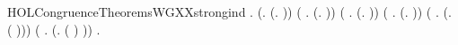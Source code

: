 \begin{SaveVerbatim}{HOLCongruenceTheoremsWGXXstrongind}
\HOLTokenTurnstile{} \HOLSymConst{\HOLTokenForall{}}.
       (\HOLSymConst{\HOLTokenForall{}}.  (\HOLTokenLambda{}. )) \HOLSymConst{\HOLTokenConj{}}
       (\HOLSymConst{\HOLTokenForall{}} .   \HOLSymConst{\HOLTokenImp{}}  (\HOLTokenLambda{}.  )) \HOLSymConst{\HOLTokenConj{}}
       (\HOLSymConst{\HOLTokenForall{}} .
              \HOLSymConst{\HOLTokenConj{}}   \HOLSymConst{\HOLTokenConj{}}   \HOLSymConst{\HOLTokenConj{}}   \HOLSymConst{\HOLTokenImp{}}
             (\HOLTokenLambda{}.   \HOLSymConst{\ensuremath{+}}  )) \HOLSymConst{\HOLTokenConj{}}
       (\HOLSymConst{\HOLTokenForall{}} .
              \HOLSymConst{\HOLTokenConj{}}   \HOLSymConst{\HOLTokenConj{}}   \HOLSymConst{\HOLTokenConj{}}   \HOLSymConst{\HOLTokenImp{}}
             (\HOLTokenLambda{}.   \HOLSymConst{\ensuremath{\parallel}}  )) \HOLSymConst{\HOLTokenConj{}}
       (\HOLSymConst{\HOLTokenForall{}} .   \HOLSymConst{\HOLTokenConj{}}   \HOLSymConst{\HOLTokenImp{}}  (\HOLTokenLambda{}. \HOLConst{\ensuremath{\nu}}  ( ))) \HOLSymConst{\HOLTokenConj{}}
       (\HOLSymConst{\HOLTokenForall{}} .   \HOLSymConst{\HOLTokenConj{}}   \HOLSymConst{\HOLTokenImp{}}  (\HOLTokenLambda{}.  ( ) )) \HOLSymConst{\HOLTokenImp{}}
       \HOLSymConst{\HOLTokenForall{}}.   \HOLSymConst{\HOLTokenImp{}}  
\end{SaveVerbatim}
